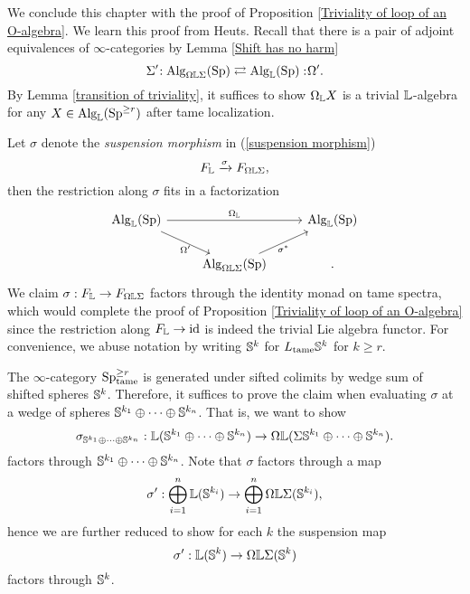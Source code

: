 We conclude this chapter with the proof of Proposition \ref{Triviality of loop of an O-algebra}.
We learn this proof from Heuts. 
Recall that there is a pair of adjoint equivalences of $\infty$-categories by Lemma \ref{Shift has no harm} 
$$
\Sigma'\negmedspace: \operatorname{Alg}_{\Omega {\mathbb{L}} \Sigma}(\operatorname{Sp}) \rightleftarrows \operatorname{Alg}_{{\mathbb{L}}}(\operatorname{Sp}):\negmedspace \Omega'.
$$
By Lemma \ref{transition of triviality},
it suffices to show $\Omega_{{\mathbb{L}}} X$ is a trivial ${\mathbb{L}}$-algebra for any $X\in \operatorname{Alg}_{{\mathbb{L}}}(\operatorname{Sp}^{\geq r})$ after tame localization.

Let $\sigma$ denote the \emph{suspension morphism} in (\ref{suspension morphism})
\[
F_{{\mathbb{L}}} \xrightarrow{\sigma} F_{\Omega {\mathbb{L}} \Sigma},
\]
then the restriction along $\sigma$ fits in a factorization
\[
\begin{tikzcd}
	\Alg_{\BL}(\Sp) &   & \Alg_{\BL}(\Sp) \\
	&  \Alg_{\Omega \BL \Sigma}(\Sp) &
	\arrow[from=1-1, to = 1-3, "\Omega_{\BL}"]
	\arrow[from=1-1 , to =2-2, "\Omega'" below]
	\arrow[from=2-2, to=1-3, "\sigma^*" below].
\end{tikzcd}
\]
We claim $\sigma:F_{{\mathbb{L}}}\to F_{\Omega {\mathbb{L}} \Sigma}$ factors through the identity monad on tame spectra, which would complete the proof of Proposition \ref{Triviality of loop of an O-algebra}
since the restriction along $F_{\mathbb{L}} \to \operatorname{id}$ is indeed the trivial Lie algebra functor. 
For convenience, we abuse notation by writing ${\mathbb{S}}^k$ for $L_{\operatorname{\operatorname{tame}}}{\mathbb{S}}^k$ for $k\geq r$.

The $\infty$-category $\operatorname{Sp}^{\geq r}_{\operatorname{\operatorname{tame}}}$ is generated under sifted colimits by wedge sum of shifted spheres ${\mathbb{S}}^k$.
Therefore, it suffices to prove the claim when evaluating $\sigma$ at a wedge of spheres
${\mathbb{S}}^{k_1}\oplus \cdots \oplus {\mathbb{S}}^{k_n}$.
That is, we want to show 
$$
\sigma_{{\mathbb{S}}^{k_1}\oplus \cdots \oplus {\mathbb{S}}^{k_n}}: 
{\mathbb{L}}({\mathbb{S}}^{k_1}\oplus \cdots \oplus {\mathbb{S}}^{k_n})
\to 
\Omega {\mathbb{L}} (\Sigma {\mathbb{S}}^{k_1}\oplus \cdots \oplus {\mathbb{S}}^{k_n}).
$$
factors through ${\mathbb{S}}^{k_1}\oplus \cdots \oplus {\mathbb{S}}^{k_n}$.
Note that $\sigma$ factors through a map
$$
\sigma':\bigoplus_{i=1}^{n} {\mathbb{L}}({\mathbb{S}}^{k_i}) \to 
\bigoplus_{i=1}^{n} \Omega{\mathbb{L}}\Sigma({\mathbb{S}}^{k_i}),
$$
hence we are further reduced to show for each $k$ the suspension map 
$$
\sigma':{\mathbb{L}}({\mathbb{S}}^{k}) \to 
\Omega{\mathbb{L}}\Sigma({\mathbb{S}}^{k})
$$
factors through ${\mathbb{S}}^{k}$.




